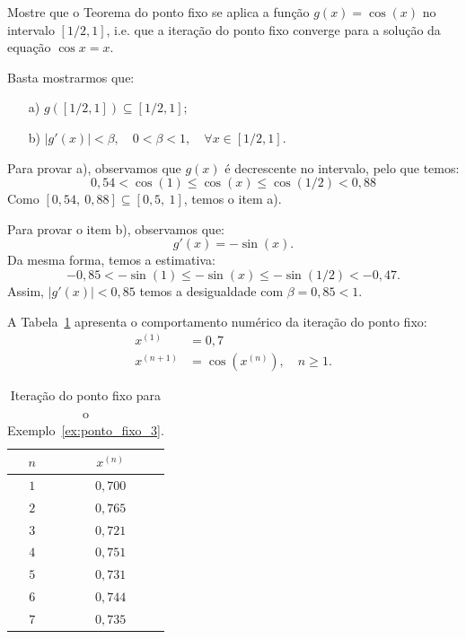 \begin{ex}\label{ex:ponto_fixo_3}
Mostre que o Teorema do ponto fixo se aplica a função $g(x) = \cos(x)$ no intervalo $[1/2, 1]$, i.e. que a iteração do ponto fixo converge para a solução da equação $\cos x = x$.
\end{ex}
\begin{sol}
  Basta mostrarmos que:
  \begin{enumerate}
  \item[a)] $g\left([1/2,1]\right) \subseteq [1/2,1]$;
  \item[b)] $|g'(x)|<\beta, \quad 0<\beta<1,\quad \forall x\in [1/2,1]$.
  \end{enumerate}

Para provar a), observamos que $g(x)$ é decrescente no intervalo, pelo que temos:
\begin{equation*}
  0,54<\cos(1)\leq \cos(x)\leq \cos(1/2)<0,88
\end{equation*}
Como $[0,54,~0,88]\subseteq [0,5,~1]$, temos o item a).

Para provar o item b), observamos que:
\begin{equation*}
  g'(x) = -\sin(x).
\end{equation*}
Da mesma forma, temos a estimativa:
\begin{equation*}
  -0,85<-\sin(1) \leq -\sin(x)\leq -\sin(1/2)<-0,47.
\end{equation*}
Assim, $|g'(x)|<0,85$ temos a desigualdade com $\beta=0,85<1$.

A Tabela~\ref{tab:ponto_fixo_3} apresenta o comportamento numérico da iteração do ponto fixo:
\begin{align*}
x^{(1)} & = 0,7\\
x^{(n+1)} &= \cos(x^{(n)}),\quad n\geq 1.
\end{align*}
\begin{table}
  \centering
  \begin{tabular}{cc}\hline
   $n$ & $x^{(n)}$ \\\hline
   $1$ & $0,700$ \\
   $2$ & $0,765$ \\
   $3$ & $0,721$ \\
   $4$ & $0,751$ \\
   $5$ & $0,731$ \\
   $6$ & $0,744$ \\
   $7$ & $0,735$ \\\hline
  \end{tabular}
  \caption{Iteração do ponto fixo para o Exemplo~\ref{ex:ponto_fixo_3}.}
  \label{tab:ponto_fixo_3}
\end{table}
\end{sol}

